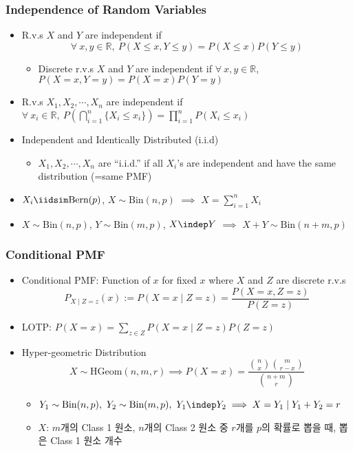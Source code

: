 \subsubsection*{Independence of Random Variables}
\begin{itemize}
    \item R.v.s $X$ and $Y$ are independent if
    \begin{equation}
        \forall~x,y\in\mathbb{R},~P(X\leq x,Y\leq y)=P(X\leq x)P(Y\leq y)
    \end{equation}
    \begin{itemize}
        \item Discrete r.v.s $X$ and $Y$ are independent if $\forall~x,y\in\mathbb{R}$, $P(X=x,Y=y)=P(X=x)P(Y=y)$
    \end{itemize}
    \item R.v.s $X_1,X_2,\cdots,X_n$ are independent if $\forall~x_i\in\mathbb{R},~P\left(\bigcap_{i=1}^n\{X_i\leq x_i\}\right)=\prod_{i=1}^nP(X_i\leq x_i)$
    \item Independent and Identically Distributed (i.i.d)
    \begin{itemize}
        \item $X_1,X_2,\cdots,X_n$ are ``i.i.d.'' if all $X_i$'s are independent and have the same distribution (=same PMF)
    \end{itemize}
    \item $X_i\iidsim\text{Bern}(p)$, $X\sim\text{Bin}(n,p)$ $\implies$ $X=\sum_{i=1}^nX_i$
    \item $X\sim\text{Bin}(n,p)$, $Y\sim\text{Bin}(m,p)$, $X\indep Y$ $\implies$ $X+Y\sim\text{Bin}(n+m,p)$
\end{itemize}

\subsubsection*{Conditional PMF}
\begin{itemize}
    \item Conditional PMF: Function of $x$ for fixed $x$ where $X$ and $Z$ are discrete r.v.s
    \begin{equation}
        P_{X\mid Z=z}(x):=P(X=x\mid Z=z)=\frac{P(X=x,Z=z)}{P(Z=z)}
    \end{equation}
    \item LOTP: $P(X=x)=\sum_{z\in Z}P(X=x\mid Z=z)P(Z=z)$
    \item Hyper-geometric Distribution
    \begin{equation}
        X\sim\text{HGeom}(n,m,r)\implies P(X=x)=\frac{\binom{n}{x}\binom{m}{r-x}}{\binom{n+m}{r}}
    \end{equation}
    \begin{itemize}
        \item $Y_1\sim\text{Bin}(n,p),~Y_2\sim\text{Bin}(m,p),~Y_1\indep Y_2\implies X=Y_1\mid Y_1+Y_2=r$
        \item $X$: $m$개의 Class 1 원소, $n$개의 Class 2 원소 중 $r$개를 $p$의 확률로 뽑을 때, 뽑은 Class 1 원소 개수
    \end{itemize}
\end{itemize}

